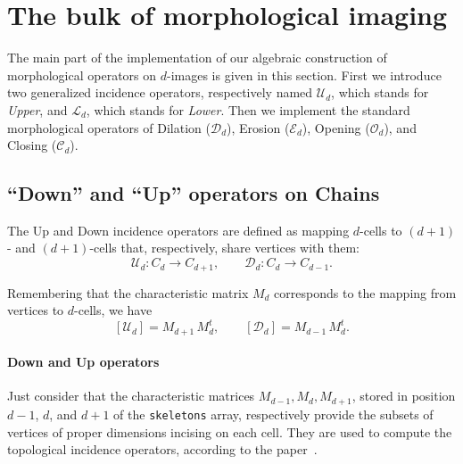 \documentclass[11pt,oneside]{article}	%
\begin{document}
\section{The bulk of morphological imaging}

The main part of the implementation of our algebraic construction of morphological operators on $d$-images is given in this section. First we introduce two generalized incidence operators, respectively named \emph{$\mathcal{U}_d$}, which stands for \emph{Upper}, and \emph{$\mathcal{L}_d$}, which stands for \emph{Lower}. Then we implement the standard morphological operators of Dilation (\emph{$\mathcal{D}_d$}), Erosion (\emph{$\mathcal{E}_d$}), Opening (\emph{$\mathcal{O}_d$}), and Closing (\emph{$\mathcal{C}_d$}).

\subsection{``Down'' and ``Up'' operators on Chains}

The Up and Down incidence operators are defined as mapping $d$-cells to $(d+1)$- and $(d+1)$-cells that, respectively, share vertices with them:
\[
\mathcal{U}_d : C_d \to C_{d+1}, \qquad \mathcal{D}_d : C_d \to C_{d-1}.
\]

Remembering that the characteristic matrix $M_d$ corresponds to the mapping from vertices to $d$-cells, we have
\[
[\mathcal{U}_d] = M_{d+1}\,M_d^t, \qquad [\mathcal{D}_d] = M_{d-1}\,M_d^t.
\]

\paragraph{Down and Up operators} Just consider that the characteristic matrices $M_{d-1},M_{d},M_{d+1}$,  stored in position $d-1$, $d$, and $d+1$ of the \texttt{skeletons} array, respectively provide the subsets of vertices of proper dimensions incising on each cell. They are used to compute the topological incidence operators, according to the paper~\cite{Dicarlo:2014:TNL:2543138.2543294}.
\end{document}
